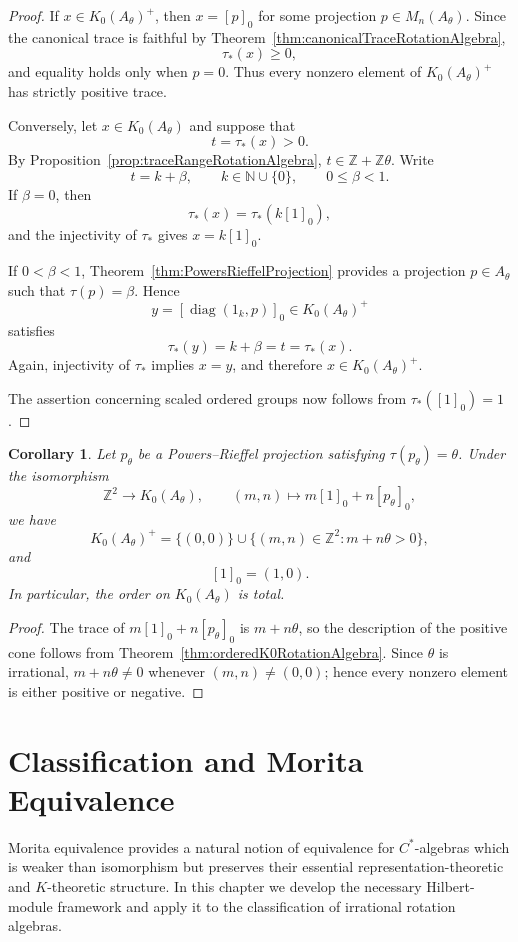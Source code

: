 \documentclass{book}
\newtheorem{corollary}[definition]{Corollary}
\def\cstars{\(C^*\)-algebras}
\begin{document}
\begin{proof}
If \(x\in K_0(A_\theta)^+\), then \(x=[p]_0\) for some projection
\(p\in M_n(A_\theta)\). Since the canonical trace is faithful by
Theorem~\ref{thm:canonicalTraceRotationAlgebra},
\[
  \tau_*(x)\geq0,
\]
and equality holds only when \(p=0\). Thus every nonzero element of
\(K_0(A_\theta)^+\) has strictly positive trace.

Conversely, let \(x\in K_0(A_\theta)\) and suppose that
\[
  t=\tau_*(x)>0.
\]
By Proposition~\ref{prop:traceRangeRotationAlgebra},
\(t\in\mathbb Z+\mathbb Z\theta\). Write
\[
  t=k+\beta,
  \qquad
  k\in\mathbb N\cup\{0\},
  \qquad
  0\leq\beta<1.
\]
If \(\beta=0\), then
\[
  \tau_*(x)=\tau_*(k[1]_0),
\]
and the injectivity of \(\tau_*\) gives \(x=k[1]_0\).

If \(0<\beta<1\), Theorem~\ref{thm:PowersRieffelProjection} provides a
projection \(p\in A_\theta\) such that \(\tau(p)=\beta\). Hence
\[
  y=
  [\operatorname{diag}(1_k,p)]_0
  \in K_0(A_\theta)^+
\]
satisfies
\[
  \tau_*(y)=k+\beta=t=\tau_*(x).
\]
Again, injectivity of \(\tau_*\) implies \(x=y\), and therefore
\(x\in K_0(A_\theta)^+\).

The assertion concerning scaled ordered groups now follows from
\(\tau_*([1]_0)=1\).
\end{proof}

\begin{corollary}\label{cor:orderedK0RotationCoordinates}
Let \(p_\theta\) be a Powers--Rieffel projection satisfying
\(\tau(p_\theta)=\theta\). Under the isomorphism
\[
  \mathbb Z^2\longrightarrow K_0(A_\theta),
  \qquad
  (m,n)\longmapsto m[1]_0+n[p_\theta]_0,
\]
we have
\[
  K_0(A_\theta)^+
  =
  \{(0,0)\}
  \cup
  \{(m,n)\in\mathbb Z^2:m+n\theta>0\},
\]
and
\[
  [1]_0=(1,0).
\]
In particular, the order on \(K_0(A_\theta)\) is total.
\end{corollary}

\begin{proof}
The trace of \(m[1]_0+n[p_\theta]_0\) is \(m+n\theta\), so the
description of the positive cone follows from
Theorem~\ref{thm:orderedK0RotationAlgebra}. Since \(\theta\) is
irrational, \(m+n\theta\neq0\) whenever \((m,n)\neq(0,0)\); hence every
nonzero element is either positive or negative.
\end{proof}

\chapter{Classification and Morita Equivalence}
Morita equivalence provides a natural notion of equivalence for \cstars
which is weaker than isomorphism but preserves their essential
representation-theoretic and \(K\)-theoretic structure. In this chapter
we develop the necessary Hilbert-module framework and apply it to the
classification of irrational rotation algebras.
\end{document}
